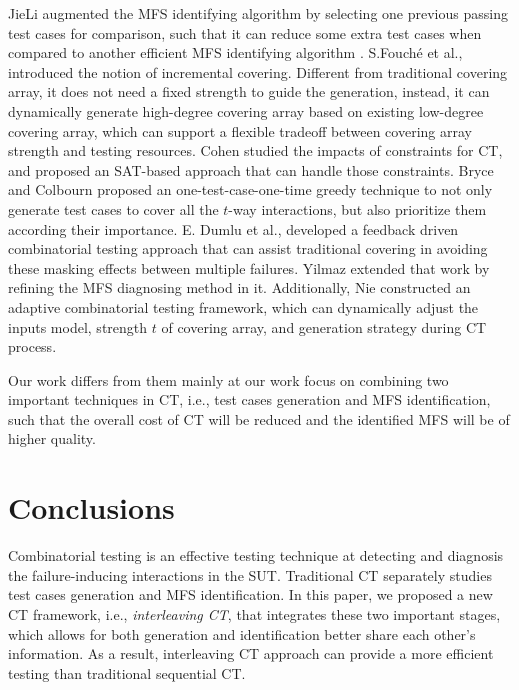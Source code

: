 \documentclass{sig-alternate}
\begin{document}

JieLi \cite{li2012improved} augmented the MFS identifying algorithm by selecting one previous passing test cases for comparison, such that it can reduce some extra test cases when compared to another efficient MFS identifying algorithm \cite{zhang2011characterizing}. S.Fouch{\'e}  et al., \cite{fouche2009incremental} introduced the notion of incremental covering. Different from traditional covering array, it does not need a fixed strength to guide the generation, instead, it can dynamically generate high-degree covering array based on existing low-degree covering array, which can support a flexible tradeoff between covering array strength and testing resources. Cohen \cite{cohen2007exploiting,cohen2008constructing} studied the impacts of constraints for CT, and proposed an SAT-based approach that can handle those constraints.  Bryce and Colbourn \cite{bryce2006prioritized} proposed an one-test-case-one-time greedy technique to not only generate test cases to cover all the $t$-way interactions, but also prioritize them according their importance.  E. Dumlu et al., \cite{dumlu2011feedback} developed a feedback driven
combinatorial testing approach that can assist traditional covering in avoiding these masking effects between multiple failures. Yilmaz \cite{yilmaz2013reducing} extended that work by refining the MFS diagnosing method in it. Additionally, Nie \cite{nie2013adaptive} constructed an adaptive combinatorial testing framework, which can dynamically adjust the inputs model, strength $t$ of covering array, and generation strategy during CT process.

Our work differs from them mainly at our work focus on combining two important techniques in CT, i.e., test cases generation and MFS identification, such that the overall cost of CT will be reduced and the identified MFS will be of higher quality.



\section{Conclusions}
Combinatorial testing is an effective testing technique at detecting and diagnosis the failure-inducing interactions in the SUT. Traditional CT separately studies test cases generation and MFS identification. In this paper, we proposed a new CT framework, i.e., \emph{interleaving CT}, that integrates these two important stages, which allows for both generation and identification better share each other's information. As a result, interleaving CT approach can provide a more efficient testing than traditional sequential CT.
\end{document}
